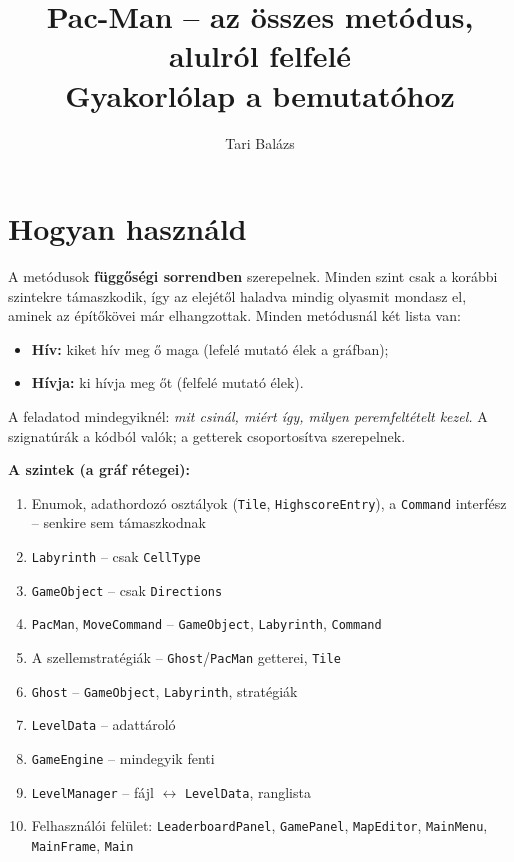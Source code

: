 \documentclass[10pt, a4paper]{article}
\title{Pac-Man -- az összes metódus, alulról felfelé\\\large Gyakorlólap a bemutatóhoz}
\author{Tari Balázs}
\date{}
\begin{document}
\maketitle
\raggedright

\section*{Hogyan használd}
A metódusok \textbf{függőségi sorrendben} szerepelnek. Minden szint csak a korábbi szintekre támaszkodik, így az elejétől haladva mindig olyasmit mondasz el, aminek az építőkövei már elhangzottak. Minden metódusnál két lista van:
\begin{itemize}[nosep]
  \item \textbf{Hív:} kiket hív meg ő maga (lefelé mutató élek a gráfban);
  \item \textbf{Hívja:} ki hívja meg őt (felfelé mutató élek).
\end{itemize}
A feladatod mindegyiknél: \textit{mit csinál, miért így, milyen peremfeltételt kezel.} A szignatúrák a kódból valók; a getterek csoportosítva szerepelnek.

\medskip
\textbf{A szintek (a gráf rétegei):}
\begin{enumerate}[nosep, start=0]
  \item Enumok, adathordozó osztályok (\texttt{Tile}, \texttt{HighscoreEntry}), a \texttt{Command} interfész -- senkire sem támaszkodnak
  \item \texttt{Labyrinth} -- csak \texttt{CellType}
  \item \texttt{GameObject} -- csak \texttt{Directions}
  \item \texttt{PacMan}, \texttt{MoveCommand} -- \texttt{GameObject}, \texttt{Labyrinth}, \texttt{Command}
  \item A szellemstratégiák -- \texttt{Ghost}/\texttt{PacMan} getterei, \texttt{Tile}
  \item \texttt{Ghost} -- \texttt{GameObject}, \texttt{Labyrinth}, stratégiák
  \item \texttt{LevelData} -- adattároló
  \item \texttt{GameEngine} -- mindegyik fenti
  \item \texttt{LevelManager} -- fájl $\leftrightarrow$ \texttt{LevelData}, ranglista
  \item Felhasználói felület: \texttt{LeaderboardPanel}, \texttt{GamePanel}, \texttt{MapEditor}, \texttt{MainMenu}, \texttt{MainFrame}, \texttt{Main}
\end{enumerate}
\end{document}
